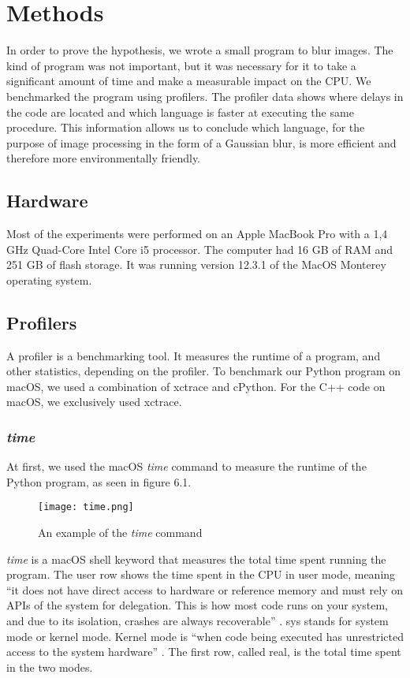 \chapter{Methods}
In order to prove the hypothesis, we wrote a small program to blur images. The kind of program was not important, but it was necessary for it to take a significant amount of time and make a measurable impact on the CPU.
We benchmarked the program using profilers. The profiler data shows where delays in the code are located and which language is faster at executing the same procedure. This information allows us to conclude which language, for the purpose of image processing in the form of a Gaussian blur, is more efficient and therefore more environmentally friendly.

\section{Hardware}
Most of the experiments were performed on an Apple MacBook Pro with a 1,4 GHz Quad-Core Intel Core i5 processor. The computer had 16 GB of RAM and 251 GB of flash storage. It was running version 12.3.1 of the MacOS Monterey operating system.

\section{Profilers}
A profiler is a benchmarking tool. It measures the runtime of a program, and other statistics, depending on the profiler. To benchmark our Python program on macOS, we used a combination of xctrace and cPython. For the C++ code on macOS, we exclusively used xctrace.

\subsection{\textit{time}}
At first, we used the macOS \textit{time} command to measure the runtime of the Python program, as seen in figure 6.1.

\begin{figure}[htbp]
	\centering
	\texttt{[image: time.png]}
	\caption{An example of the \textit{time} command}
	\label{figure:time}
\end{figure}

\textit{time} is a macOS shell keyword that measures the total time spent running the program. The user row shows the time spent in the CPU in user mode, meaning “it does not have direct access to hardware or reference memory and must rely on APIs of the system for delegation. This is how most code runs on your system, and due to its isolation, crashes are always recoverable” \cite{time}. sys stands for system mode or kernel mode. Kernel mode is “when code being executed has unrestricted access to the system hardware” \cite{time}. The first row, called real, is the total time spent in the two modes.

